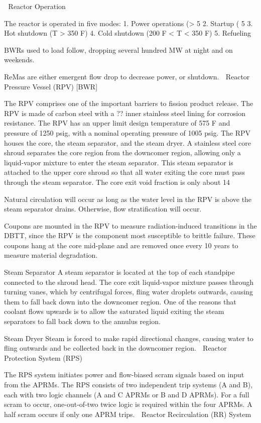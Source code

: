 \documentclass[10pt]{article}
\begin{document}

Reactor Operation

The reactor is operated in five modes:
1.	Power operations (> 5%
2.	Startup ( 5%
3.	Hot shutdown (T > 350 F)
4.	Cold shutdown (200 F < T < 350 F)
5.	Refueling

BWRs used to load follow, dropping several hundred MW at night and on weekends. 

ReMas are either emergent flow drop to decrease power, or shutdown. 
Reactor Pressure Vessel (RPV) [BWR]

The RPV comprises one of the important barriers to fission product release. The RPV is made of carbon steel with a ?? inner stainless steel lining for corrosion resistance. The RPV has an upper limit design temperature of 575 F and pressure of 1250 psig, with a nominal operating pressure of 1005 psig. The RPV houses the core, the steam separator, and the steam dryer. A stainless steel core shroud separates the core region from the downcomer region, allowing only a liquid-vapor mixture to enter the steam separator. This steam separator is attached to the upper core shroud so that all water exiting the core must pass through the steam separator. The core exit void fraction is only about 14%

Natural circulation will occur as long as the water level in the RPV is above the steam separator drains. Otherwise, flow stratification will occur. 

Coupons are mounted in the RPV to measure radiation-induced transitions in the DBTT, since the RPV is the component most susceptible to brittle failure. These coupons hang at the core mid-plane and are removed once every 10 years to measure material degradation. 

Steam Separator
A steam separator is located at the top of each standpipe connected to the shroud head. The core exit liquid-vapor mixture passes through turning vanes, which by centrifugal forces, fling water droplets outwards, causing them to fall back down into the downcomer region. One of the reasons that coolant flows upwards is to allow the saturated liquid exiting the steam separators to fall back down to the annulus region. 

Steam Dryer
Steam is forced to make rapid directional changes, causing water to fling outwards and be collected back in the downcomer region. 
Reactor Protection System (RPS)

The RPS system initiates power and flow-biased scram signals based on input from the APRMs. The RPS consists of two independent trip systems (A and B), each with two logic channels (A and C APRMs or B and D APRMs). For a full scram to occur, one-out-of-two twice logic is required within the four APRMs. A half scram occurs if only one APRM trips. 
Reactor Recirculation (RR) System
\end{document}
